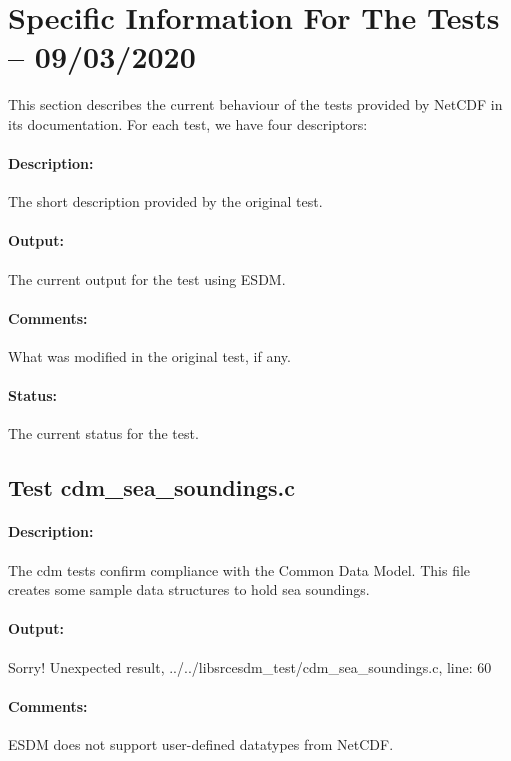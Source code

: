 \section{Specific Information For The Tests -- 09/03/2020}
\label{sec:nctests}

This section describes the current behaviour of the tests provided by NetCDF in its documentation.
For each test, we have four descriptors:

\paragraph{Description:} The short description provided by the original test.

\paragraph{Output:} The current output for the test using ESDM.

\paragraph{Comments:} What was modified in the original test, if any.

\paragraph{Status:} The current status for the test.

\subsection{Test cdm\_sea\_soundings.c}

\paragraph{Description:} The cdm tests confirm compliance with the Common Data Model.
This file creates some sample data structures to hold sea soundings.

\paragraph{Output:} Sorry! Unexpected result, ../../libsrcesdm\_test/cdm\_sea\_soundings.c, line: 60

\paragraph{Comments:} ESDM does not support user-defined datatypes from NetCDF.

